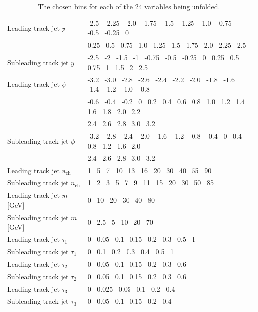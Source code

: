 \begin{table}[h!]
\begin{tabular}{l|l}
    Leading track jet $y$                   & -2.5~ -2.25~ -2.0~ -1.75~ -1.5~ -1.25~ -1.0~ -0.75~ -0.5~ -0.25~ 0~ \\
                                            & 0.25~ 0.5~ 0.75~ 1.0~ 1.25~ 1.5~ 1.75~ 2.0~ 2.25~ 2.5 \\ \hline
    Subleading track jet $y$                & -2.5~ -2~ -1.5~ -1~ -0.75~ -0.5~ -0.25~ 0~ 0.25~ 0.5~ 0.75~ 1~ 1.5~ 2~ 2.5 \\ \hline
    Leading track jet $\phi$                & -3.2~ -3.0~ -2.8~ -2.6~ -2.4~ -2.2~ -2.0~ -1.8~ -1.6~ -1.4~ -1.2~ -1.0~ -0.8~ \\
                                            & -0.6~ -0.4~ -0.2~ 0~ 0.2~ 0.4~ 0.6~ 0.8~ 1.0~ 1.2~ 1.4~ 1.6~ 1.8~ 2.0~ 2.2~ \\
                                            & 2.4~ 2.6~ 2.8~ 3.0~ 3.2 \\ \hline
    Subleading track jet $\phi$             & -3.2~ -2.8~ -2.4~ -2.0~ -1.6~ -1.2~ -0.8~ -0.4~ 0~ 0.4~ 0.8~ 1.2~ 1.6~ 2.0~ \\
                                            & 2.4~ 2.6~ 2.8~ 3.0~ 3.2 \\ \hline
    Leading track jet $n_{\text{ch}}$       & 1~ 5~ 7~ 10~ 13~ 16~ 20~ 30~ 40~ 55~ 90 \\ \hline
    Subleading track jet $n_{\text{ch}}$    & 1~ 2~ 3~ 5~ 7~ 9~ 11~ 15~ 20~ 30~ 50~ 85 \\ \hline
    Leading track jet $m$ [GeV]             & 0~ 10~ 20~ 30~ 40~ 80 \\ \hline
    Subleading track jet $m$ [GeV]          & 0~ 2.5~ 5~ 10~ 20~ 70 \\ \hline
    Leading track jet $\tau_1$              & 0~ 0.05~ 0.1~ 0.15~ 0.2~ 0.3~ 0.5~ 1 \\ \hline
    Subleading track jet $\tau_1$           & 0~ 0.1~ 0.2~ 0.3~ 0.4~ 0.5~ 1 \\ \hline
    Leading track jet $\tau_2$              & 0~ 0.05~ 0.1~ 0.15~ 0.2~ 0.3~ 0.6 \\ \hline
    Subleading track jet $\tau_2$           & 0~ 0.05~ 0.1~ 0.15~ 0.2~ 0.3~ 0.6 \\ \hline
    Leading track jet $\tau_3$              & 0~ 0.025~ 0.05~ 0.1~ 0.2~ 0.4 \\ \hline
    Subleading track jet $\tau_3$           & 0~ 0.05~ 0.1~ 0.15~ 0.2~ 0.4 \\ \hline

    \end{tabular}
    \caption{The chosen bins for each of the 24 variables being unfolded.}
    \label{tab:IBUBins}
\end{table}

